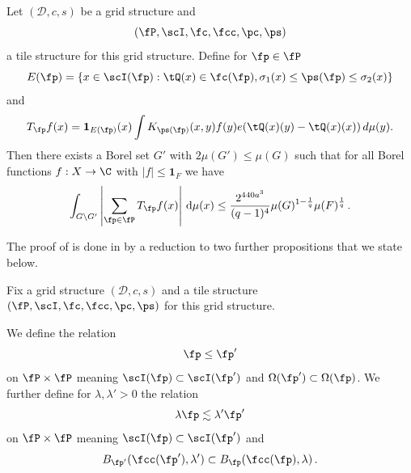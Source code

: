 \begin{proposition}
\label{discrete-Carleson}
\leanok
{}
Let $(\mathcal{D}, c, s)$ be a grid structure and
\begin{equation*}
    (\fP,\scI,\fc,\fcc,\pc,\ps)
\end{equation*}
a tile structure for this grid structure.
Define for $\fp\in \fP$
\begin{equation}\label{defineep}
    E(\fp)=\{x\in \scI(\fp): \tQ(x)\in \fc(\fp) , {\sigma_1}(x)\le \ps(\fp)\le {\sigma_2}(x)\}
\end{equation}
and
\begin{equation}\label{definetp}
    T_{\fp} f(x)= \mathbf{1}_{E(\fp)}(x) \int K_{\ps(\fp)}(x,y) f(y) e(\tQ(x)(y)-\tQ(x)(x))\, d\mu(y).
\end{equation}
Then there exists a Borel set $G'$ with $2\mu(G') \leq \mu(G)$ such that for all Borel functions $f:X\to \C$ with $|f|\le \mathbf{1}_F$
we have
\begin{equation}
    \label{disclesssim}
   \int_{G \setminus G'} \left| \sum_{\fp \in \fP} T_{\fp} f (x) \right| \, \mathrm{d}\mu(x) \le \frac{2^{440a^3}}{(q-1)^4} \mu(G)^{1-\frac{1}{q}} \mu(F)^{\frac{1}{q}}\,.
\end{equation}
\end{proposition}









The proof of  is done in 
by a reduction to two further propositions that we state below.


Fix a grid structure $(\mathcal{D}, c, s)$ and a tile structure $(\fP,\scI,\fc,\fcc,\pc,\ps)$
for this grid structure.

We define the relation
\begin{equation}\label{straightorder}
    \fp\le \fp'
\end{equation}
 on $\fP\times \fP$ meaning
$\scI(\fp)\subset \scI(\fp')$ and
$\Omega(\fp')\subset \Omega(\fp)$.
We further define for $\lambda,\lambda' >0$
the relation
\begin{equation}\label{wiggleorder}
    \lambda \fp \lesssim \lambda' \fp'
\end{equation}
on $\fP\times \fP$ meaning
$\scI(\fp)\subset \scI(\fp')$ and
\begin{equation}
    B_{\fp'}(\fcc(\fp'),\lambda') \subset B_{\fp}(\fcc(\fp),\lambda)\, .
\end{equation}



